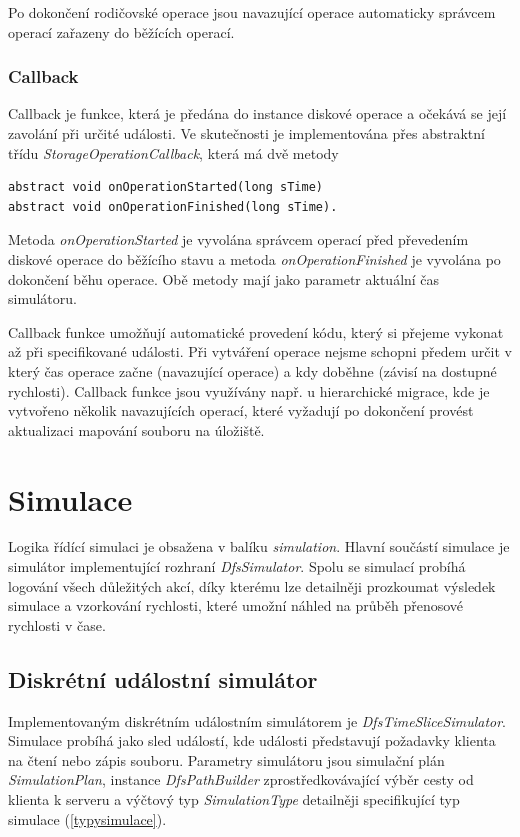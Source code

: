 \documentclass[czech,DP]{thesiskiv}
\begin{document}
\noindent Po dokončení rodičovské operace jsou navazující operace automaticky správcem operací zařazeny do běžících operací.

\subsubsection*{Callback}

Callback je funkce, která je předána do instance diskové operace a očekává se její zavolání při určité události. Ve skutečnosti je implementována přes abstraktní třídu \textit{StorageOperationCallback}, která má dvě metody

\begin{verbatim}
abstract void onOperationStarted(long sTime)
abstract void onOperationFinished(long sTime).
\end{verbatim}

\noindent Metoda \textit{onOperationStarted} je vyvolána správcem operací před převedením diskové operace do běžícího stavu a metoda \textit{onOperationFinished} je vyvolána po dokončení běhu operace. Obě metody mají jako parametr aktuální čas simulátoru.

Callback funkce umožňují automatické provedení kódu, který si přejeme vykonat až při specifikované události. Při vytváření operace nejsme schopni předem určit v který čas operace začne (navazující operace) a kdy doběhne (závisí na dostupné rychlosti). Callback funkce jsou využívány např. u hierarchické migrace, kde je vytvořeno několik navazujících operací, které vyžadují po dokončení provést aktualizaci mapování souboru na úložiště.

\section{Simulace}

Logika řídící simulaci je obsažena v balíku \textit{simulation}. Hlavní součástí simulace je simulátor implementující rozhraní \textit{DfsSimulator}. Spolu se simulací probíhá logování všech důležitých akcí, díky kterému lze detailněji prozkoumat výsledek simulace a vzorkování rychlosti, které umožní náhled na průběh přenosové rychlosti v čase.

\subsection{Diskrétní událostní simulátor}

Implementovaným diskrétním událostním simulátorem je \textit{DfsTimeSliceSimulator}. Simulace probíhá jako sled událostí, kde události představují požadavky klienta na čtení nebo zápis souboru. Parametry simulátoru jsou simulační plán \textit{SimulationPlan}, instance \textit{DfsPathBuilder} zprostředkovávající výběr cesty od klienta k serveru a výčtový typ \textit{SimulationType} detailněji specifikující typ simulace (\ref{typysimulace}).
\end{document}
